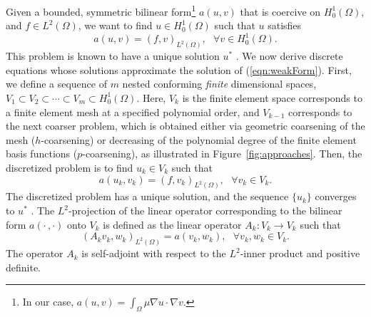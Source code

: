 \documentclass[smallcondensed,final]{svjour3}     %
\begin{document}
Given a bounded, symmetric bilinear form\footnote{In our case,
  $a(u,v)=\int_\Omega \mu\nabla u \cdot \nabla v$.} $a(u,v)$ that is
coercive
on $H_0^{1}(\Omega)$, and $f \in L^{2}(\Omega)$, we want to find $u
\in H_0^{1}(\Omega)$ such that $u$ satisfies
\begin{equation}
\label{eqn:weakForm}
a(u,v) =  (f,v)_{L^2(\Omega)}, \ \ \ \forall v \in H_0^{1}(\Omega).
\end{equation}
This problem is known to have a unique solution $u^*$ \cite{BrennerScott94}. 
We now derive discrete equations whose solutions
approximate the solution of
(\ref{eqn:weakForm}). First, we define a sequence of $m$ nested conforming {\em finite}
dimensional spaces, $V_1 \subset V_2 \subset \cdots \subset V_m \subset
H_0^{1}(\Omega)$.
Here, $V_k$ is the finite element space corresponds to a finite element mesh
at a specified
polynomial order, and $V_{k-1}$ corresponds to the next coarser
problem, which is obtained either via geometric coarsening of the
mesh ($h$-coarsening) or decreasing of the polynomial degree of the
finite element basis functions ($p$-coarsening), as illustrated in
Figure~\ref{fig:approaches}.  Then, the discretized problem is to find
$u_k \in V_k$ such that
\begin{equation*}
a(u_{k},v_k) = (f,v_k)_{L^2(\Omega)}, \ \ \ \forall v_k \in V_k.
\end{equation*}
The discretized problem has a unique solution, and the sequence
$\{u_k\}$ converges to $u^*$ \cite{BrennerScott94}.
%
The $L^2$-projection of the linear operator corresponding to the
bilinear form $a(\cdot\,,\cdot)$ onto $V_k$ is defined as the linear
operator $A_k : V_{k} \rightarrow V_{k}$ such that
\begin{equation}
\label{eqn:fematDef}
(A_{k} v_k,w_k)_{L^2(\Omega)} = a(v_k,w_k),  \ \ \ \forall v_k,w_k \in V_k.
\end{equation}
The operator $A_k$ is self-adjoint
with respect to the $L^2$-inner product and positive definite.
\end{document}
